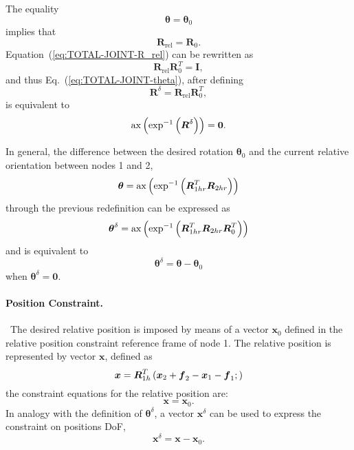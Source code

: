 \documentclass[10pt,dvips,fleqn]{report}
\newcommand{\T}[1]{\boldsymbol{#1}}
\begin{document}
The equality
\begin{equation}
	\T{\theta} = \T{\theta}_0
	\label{eq:TOTAL-JOINT-theta}
\end{equation}
implies that
\begin{equation}
	\T{R}_{\mathrm{rel}} = \T{R}_0 .
	\label{eq:TOTAL-JOINT-R_rel}
\end{equation}
Equation~(\ref{eq:TOTAL-JOINT-R_rel}) can be rewritten as
\begin{equation}
	\T{R}_{\mathrm{rel}} \T{R}_0^T = \T{I} ,
\end{equation}
and thus Eq.~(\ref{eq:TOTAL-JOINT-theta}),
after defining
\begin{equation}
	\T{R}^{\delta} = \T{R}_{\text{rel}} \T{R}_0^T ,
\end{equation}
is equivalent to
\begin{equation}
	\llk{ax}\plbr{\exp^{-1}\plbr{\T{R}^{\delta}}} = \T{0} .
	\label{eq:TOTAL-JOINT-R^delta}
\end{equation}

\noindent
In general, the difference between the desired rotation
$\T{\theta}_0$ and the current relative orientation between
nodes 1 and 2,
\begin{equation}
	\T{\theta} = \llk{ax}\plbr{\exp^{-1}\plbr{
		\T{R}_{1hr}^T \T{R}_{2hr}
	}}
	\label{eq:TOTAL-JOINT-thetadelta}
\end{equation}
through the previous redefinition can be expressed as
\begin{equation}
	\T{\theta}^{\delta} = \llk{ax}\plbr{\exp^{-1}\plbr{
		\T{R}_{1hr}^T \T{R}_{2hr} \T{R}_0^T
	}}
\end{equation}
and is equivalent to
\begin{equation}
	\T{\theta}^{\delta} = \T{\theta} - \T{\theta}_0
\end{equation}
when $\T{\theta}^{\delta}=\T{0}$.

\paragraph{Position Constraint.} \
The desired relative position is imposed by means of a vector $\T{x}_0$
defined in the relative position constraint reference frame of node 1.
The relative position is represented by vector $\T{x}$, defined as
\begin{equation}
	\T{x} = \T{R}_{1h}^T\plbr{
		\T{x}_2 + \T{f}_2 - \T{x}_1 - \T{f}_1 ;
	}
\end{equation}
the constraint equations for the relative position are:
\begin{equation}
	\T{x} = \T{x}_0 .
\end{equation}
In analogy with the definition of $\T{\theta}^{\delta}$, a vector
$\T{x}^{\delta}$ can be used to express the constraint on positions DoF,
\begin{equation}
	\T{x}^{\delta} = \T{x} - \T{x}_0 .
\end{equation}
\end{document}

